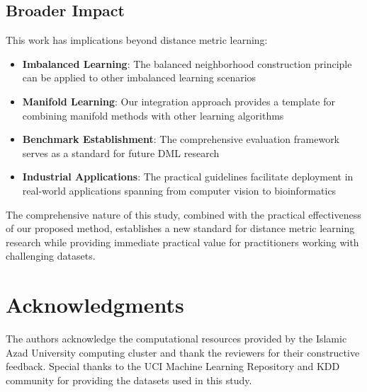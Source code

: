 \documentclass[review]{elsarticle}
\begin{document}
\subsection{Broader Impact}

This work has implications beyond distance metric learning:

\begin{itemize}
\item \textbf{Imbalanced Learning}: The balanced neighborhood construction principle can be applied to other imbalanced learning scenarios
\item \textbf{Manifold Learning}: Our integration approach provides a template for combining manifold methods with other learning algorithms  
\item \textbf{Benchmark Establishment}: The comprehensive evaluation framework serves as a standard for future DML research
\item \textbf{Industrial Applications}: The practical guidelines facilitate deployment in real-world applications spanning from computer vision to bioinformatics
\end{itemize}

The comprehensive nature of this study, combined with the practical effectiveness of our proposed method, establishes a new standard for distance metric learning research while providing immediate practical value for practitioners working with challenging datasets.

\section*{Acknowledgments}

The authors acknowledge the computational resources provided by the Islamic Azad University computing cluster and thank the reviewers for their constructive feedback. Special thanks to the UCI Machine Learning Repository and KDD community for providing the datasets used in this study.
\end{document}
